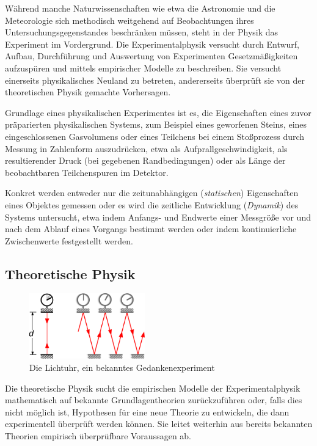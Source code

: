 \documentclass[titlepage, parkskip=full, twocolumn, landscape]{scrartcl}
\begin{document}
Während manche Naturwissenschaften wie etwa die Astronomie und die Meteorologie sich methodisch weitgehend auf Beobachtungen ihres Untersuchungsgegenstandes beschränken müssen, steht in der Physik das Experiment im Vordergrund. Die Experimentalphysik versucht durch Entwurf, Aufbau, Durchführung und Auswertung von Experimenten Gesetzmäßigkeiten aufzuspüren und mittels empirischer Modelle zu beschreiben. Sie versucht einerseits physikalisches Neuland zu betreten, andererseits überprüft sie von der theoretischen Physik gemachte Vorhersagen.

Grundlage eines physikalischen Experimentes ist es, die Eigenschaften eines zuvor präparierten physikalischen Systems, zum Beispiel eines geworfenen Steins, eines eingeschlossenen Gasvolumens oder eines Teilchens bei einem Stoßprozess durch Messung in Zahlenform auszudrücken, etwa als Aufprallgeschwindigkeit, als resultierender Druck (bei gegebenen Randbedingungen) oder als Länge der beobachtbaren Teilchenspuren im Detektor.

Konkret werden entweder nur die zeitunabhängigen (\emph{statischen}) Eigenschaften eines Objektes gemessen oder es wird die zeitliche Entwicklung (\emph{Dynamik}) des Systems untersucht, etwa indem Anfangs- und Endwerte einer Messgröße vor und nach dem Ablauf eines Vorgangs bestimmt werden oder indem kontinuierliche Zwischenwerte festgestellt werden.

\subsection{Theoretische Physik}

\begin{figure}
	\centering
	\includegraphics[width=5cm]{images/3}
	\caption{Die Lichtuhr, ein bekanntes Gedankenexperiment}
\end{figure}

Die theoretische Physik sucht die empirischen Modelle der Experimentalphysik mathematisch auf bekannte Grundlagentheorien zurückzuführen oder, falls dies nicht möglich ist, Hypothesen für eine neue Theorie zu entwickeln, die dann experimentell überprüft werden können. Sie leitet weiterhin aus bereits bekannten Theorien empirisch überprüfbare Voraussagen ab.
\end{document}
